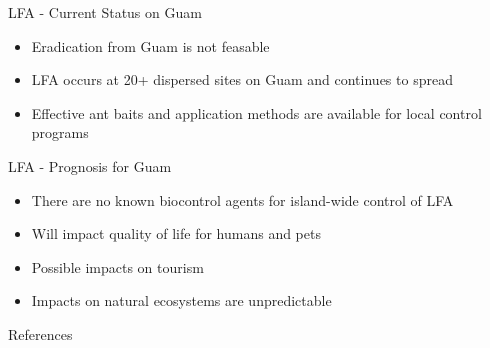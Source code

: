 \documentclass[]{beamer}
\begin{document}
\begin{frame}{LFA - Current Status on Guam}
	\begin{itemize}
		\item Eradication from Guam is not feasable
		\item LFA occurs at 20+ dispersed sites on Guam and continues to spread
		\item Effective ant baits and application methods are available for local control programs
	\end{itemize}
\end{frame}

\begin{frame}{LFA - Prognosis for Guam}
	\begin{itemize}
		\item There are no known biocontrol agents for island-wide control of LFA
		\item Will impact quality of life for humans and pets
		\item Possible impacts on tourism
		\item Impacts on natural ecosystems are unpredictable
	\end{itemize}
\end{frame}


\begin{frame}{}
\end{frame}

\begin{frame}{References}
	\nocite{*}
	\printbibliography
\end{frame}
\end{document}
